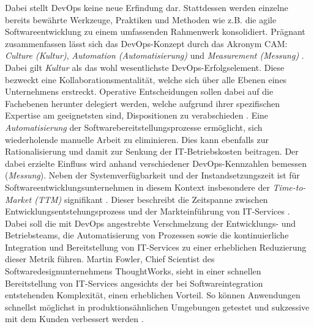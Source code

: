 Dabei stellt DevOps keine neue Erfindung dar. Stattdessen werden einzelne bereits bewährte Werkzeuge, Praktiken und Methoden wie z.B. die agile Softwareentwicklung zu einem umfassenden Rahmenwerk konsolidiert. Prägnant zusammenfassen lässt sich das DevOps-Konzept durch das Akronym CAM: \textit{Culture (Kultur)}, \textit{Automation (Automatisierung)} und \textit{Measurement (Messung)} \cite[5]{Halstenberg.2020}. Dabei gilt \textit{Kultur} als das wohl wesentlichste DevOps-Erfolgselement. Diese bezweckt eine Kollaborationsmentalität, welche sich über alle Ebenen eines Unternehmens erstreckt. Operative Entscheidungen sollen dabei auf die Fachebenen herunter delegiert werden, welche aufgrund ihrer spezifischen Expertise am geeignetsten sind, Dispositionen zu verabschieden \cite[5]{Halstenberg.2020}. Eine \textit{Automatisierung} der Softwarebereitstellungsprozesse ermöglicht, sich wiederholende manuelle Arbeit zu eliminieren. Dies kann ebenfalls zur Rationalisierung und damit zur Senkung der IT-Betriebskosten beitragen. Der dabei erzielte Einfluss wird anhand verschiedener DevOps-Kennzahlen bemessen (\textit{Messung}). Neben der Systemverfügbarkeit und der Instandsetzungszeit ist für Softwareentwicklungsunternehmen in diesem Kontext insbesondere der \textit{Time-to-Market (\acs{TTM})} signifikant \cite[7]{Halstenberg.2020}. Dieser beschreibt die Zeitspanne zwischen Entwicklungsentstehungsprozess und der Markteinführung von IT-Services \cite[141]{Vesey.1992}. Dabei soll die mit DevOps angestrebte Verschmelzung der Entwicklungs- und Betriebsteams, die Automatisierung von Prozessen sowie die kontinuierliche Integration und Bereitstellung von IT-Services zu einer erheblichen Reduzierung dieser Metrik führen. Martin Fowler, Chief Scientist des Softwaredesignunternehmens ThoughtWorks, sieht in einer schnellen Bereitstellung von IT-Services angesichts der bei Softwareintegration entstehenden Komplexität, einen erheblichen Vorteil. So können Anwendungen schnellst möglichst in produktionsähnlichen Umgebungen getestet und sukzessive mit dem Kunden verbessert werden \cite{.20230407}. 

